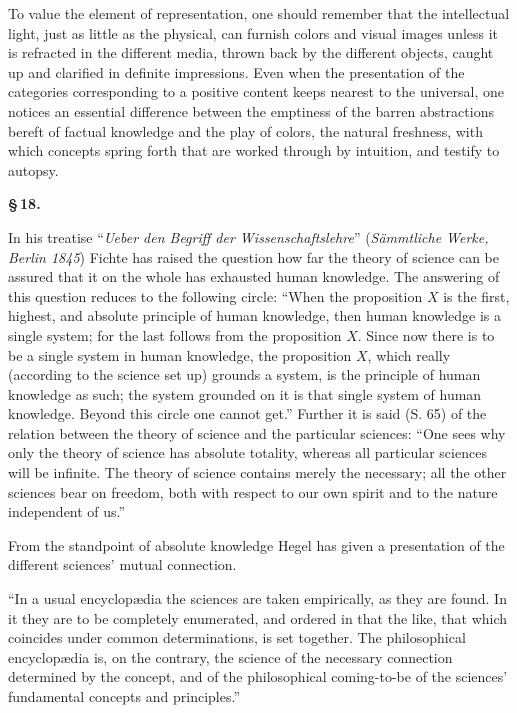 \documentclass[12pt]{book}
\begin{document}
To value the element of representation, one should remember that the intellectual light, just
as little as the physical, can furnish colors and visual images unless it is refracted in the
different media, thrown back by the different objects, caught up and clarified in definite
impressions. Even when the presentation of the categories corresponding to a positive content
keeps nearest to the universal, one notices an essential difference between the emptiness of
the barren abstractions bereft of factual knowledge and the play of colors, the natural
freshness, with which concepts spring forth that are worked through by intuition, and testify
to autopsy.

\begin{center}{\bfseries \S\,18.}\end{center}

In his treatise ``\textit{Ueber den Begriff der Wissenschaftslehre}'' (\textit{Sämmtliche
Werke, Berlin 1845}) Fichte has raised the question how far the theory of science can be
assured that it on the whole has exhausted human knowledge. The answering of this question
reduces to the following circle: ``When the proposition $X$ is the first, highest, and
absolute principle of human knowledge, then human knowledge is a single system; for the last
follows from the proposition $X$. Since now there is to be a single system in human knowledge,
the proposition $X$, which really (according to the science set up) grounds a system, is the
principle of human knowledge as such; the system grounded on it is that single system of human
knowledge. Beyond this circle one cannot get.'' Further it is said (S. 65) of the relation
between the theory of science and the particular sciences: ``One sees why only the theory of
science has absolute totality, whereas all particular sciences will be
infinite. The theory of science contains merely the necessary; all the other sciences bear on
freedom, both with respect to our own spirit and to the nature independent of us.''

From the standpoint of absolute knowledge Hegel has given a presentation of the different
sciences' mutual connection.

``In a usual encyclopædia the sciences are taken empirically, as they are found. In it they
are to be completely enumerated, and ordered in that the like, that which coincides under
common determinations, is set together. The philosophical encyclopædia is, on the contrary,
the science of the necessary connection determined by the concept, and of the philosophical
coming-to-be of the sciences' fundamental concepts and principles.''
\end{document}
